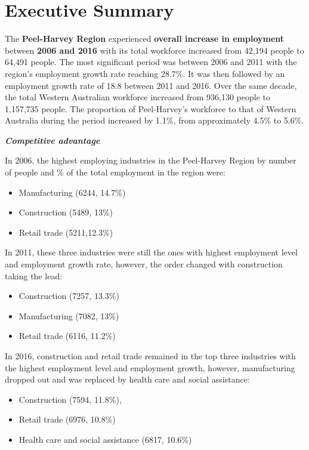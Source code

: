 \documentclass[
]{book}
\begin{document}
\hypertarget{executive-summary-5}{%
\section{Executive Summary}\label{executive-summary-5}}

The \textbf{Peel-Harvey Region} experienced \textbf{overall increase in employment} between \textbf{2006 and 2016} with its total workforce increased from 42,194 people to 64,491 people. The most significant period was between 2006 and 2011 with the region's employment growth rate reaching 28.7\%. It was then followed by an employment growth rate of 18.8 between 2011 and 2016. Over the same decade, the total Western Australian workforce increased from 936,130 people to 1,157,735 people. The proportion of Peel-Harvey's workforce to that of Western Australia during the period increased by 1.1\%, from approximately 4.5\% to 5.6\%.

\textbf{\emph{Competitive advantage}}

In 2006, the highest employing industries in the Peel-Harvey Region by number of people and \% of the total employment in the region were:~

\begin{itemize}
\item
  Manufacturing (6244, 14.7\%)~
\item
  Construction (5489, 13\%)~
\item
  Retail trade (5211,12.3\%)
\end{itemize}

In 2011, these three industries were still the ones with highest employment level and employment growth rate, however, the order changed with construction taking the lead:~

\begin{itemize}
\item
  Construction (7257, 13.3\%)
\item
  Manufacturing (7082, 13\%)
\item
  Retail trade (6116, 11.2\%)~
\end{itemize}

In 2016, construction and retail trade remained in the top three industries with the highest employment level and employment growth, however, manufacturing dropped out and was replaced by health care and social assistance:~

\begin{itemize}
\item
  Construction (7594, 11.8\%),~
\item
  Retail trade (6976, 10.8\%)~
\item
  Health care and social assistance (6817, 10.6\%)~
\end{itemize}
\end{document}
